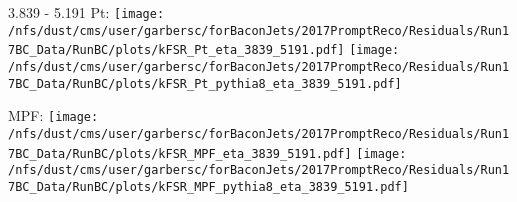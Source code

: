 \documentclass[t,compress]{beamer}
\begin{document}
\begin{frame}{3.839 - 5.191}
	 Pt: \texttt{[image: /nfs/dust/cms/user/garbersc/forBaconJets/2017PromptReco/Residuals/Run17BC\_Data/RunBC/plots/kFSR\_Pt\_eta\_3839\_5191.pdf]}
	\texttt{[image: /nfs/dust/cms/user/garbersc/forBaconJets/2017PromptReco/Residuals/Run17BC\_Data/RunBC/plots/kFSR\_Pt\_pythia8\_eta\_3839\_5191.pdf]}
\newline

	 MPF: \texttt{[image: /nfs/dust/cms/user/garbersc/forBaconJets/2017PromptReco/Residuals/Run17BC\_Data/RunBC/plots/kFSR\_MPF\_eta\_3839\_5191.pdf]}
	\texttt{[image: /nfs/dust/cms/user/garbersc/forBaconJets/2017PromptReco/Residuals/Run17BC\_Data/RunBC/plots/kFSR\_MPF\_pythia8\_eta\_3839\_5191.pdf]}
\end{frame}
\end{document}
